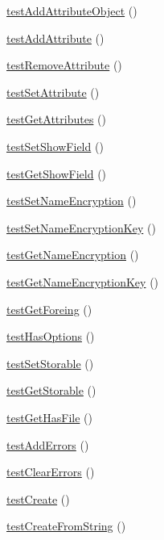 \begin{DoxyCompactItemize}
\item 
\hyperlink{class_element_test_ab2c2e68c0f60c713d68e826339ba7901}{testAddAttributeObject} ()
\item 
\hyperlink{class_element_test_ab4dde936a604e1a8a6883db5c6c995d7}{testAddAttribute} ()
\item 
\hyperlink{class_element_test_a89c6d6773794f968de1ff4e0f4cc4d1c}{testRemoveAttribute} ()
\item 
\hyperlink{class_element_test_a3e0f9ad1fc54e41c11bc5adeec46acc9}{testSetAttribute} ()
\item 
\hyperlink{class_element_test_aa3715e2191c6f99c926f1af9fa784eb5}{testGetAttributes} ()
\item 
\hyperlink{class_element_test_ac411fc625bf192b6fd8e850115eb8f25}{testSetShowField} ()
\item 
\hyperlink{class_element_test_a02c172c1ee9b7406de84b3cfeb68e75c}{testGetShowField} ()
\item 
\hyperlink{class_element_test_aab0c54c37022421730b2d3c0f2b65c72}{testSetNameEncryption} ()
\item 
\hyperlink{class_element_test_ae591f8ca3247335c6028b01c883592c3}{testSetNameEncryptionKey} ()
\item 
\hyperlink{class_element_test_aca615966ec942ed98964607789fc499a}{testGetNameEncryption} ()
\item 
\hyperlink{class_element_test_a3c513ba39c243a7eb1648fb05e54e3de}{testGetNameEncryptionKey} ()
\item 
\hyperlink{class_element_test_a9fd07f659e5e8b9f29f9f9e469929162}{testGetForeing} ()
\item 
\hyperlink{class_element_test_a1a4878cea5b79a834f2c9afc4721a361}{testHasOptions} ()
\item 
\hyperlink{class_element_test_a5b6a6d2555cf80fb9dc8ed12e1fe2260}{testSetStorable} ()
\item 
\hyperlink{class_element_test_a42f6d727065d9cd644b43c63049fc6a3}{testGetStorable} ()
\item 
\hyperlink{class_element_test_acae51e330f3a5077cdeaccddf5473f94}{testGetHasFile} ()
\item 
\hyperlink{class_element_test_a352e9d06ff4408b8a3c991f21c70722e}{testAddErrors} ()
\item 
\hyperlink{class_element_test_a8e813e63186370156c7aca5763fbd684}{testClearErrors} ()
\item 
\hyperlink{class_element_test_a9842d425e801b4ff5633ad4c24bfc359}{testCreate} ()
\item 
\hyperlink{class_element_test_a3cad92cb6bdb781785d7a04444d6fd6e}{testCreateFromString} ()

\end{DoxyCompactItemize}

